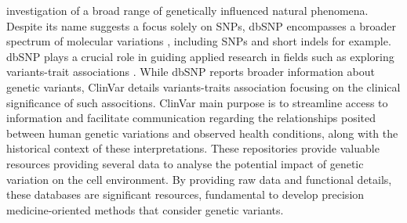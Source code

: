 \documentclass[a4paper, titlepage, openright]{book}
\begin{document}
investigation of a broad range of genetically influenced natural phenomena. Despite its name suggests a focus solely on SNPs, dbSNP encompasses a broader spectrum of molecular variations \citep{sherry1999dbsnp}, including SNPs and short indels for example. dbSNP plays a crucial role in guiding applied research in fields such as exploring variants-trait associations \citep{kitts2002single}. While dbSNP reports broader information about genetic variants, ClinVar \citep{landrum2020clinvar} details variants-traits association focusing on the clinical significance of such associtions. ClinVar main purpose is to streamline access to information and facilitate communication regarding the relationships posited between human genetic variations and observed health conditions, along with the historical context of these interpretations. These repositories provide valuable resources providing several data to analyse the potential impact of genetic variation on the cell environment. By providing raw data and functional details, these databases are significant resources, fundamental to develop precision medicine-oriented methods that consider genetic variants. 

\end{document}
